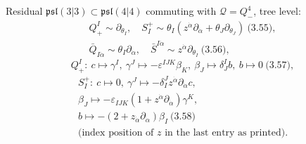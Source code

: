 \documentclass[10pt]{article}
\begin{document}
Residual $\mathfrak{psl}(3|3)\subset\mathfrak{psl}(4|4)$ commuting with $\mathcal Q=Q^4_-$, tree level:
\begin{gather*}
Q^I_+\sim\partial_{\theta_I},\quad S^+_I\sim\theta_I(z^{\dot\alpha}\partial_{\dot\alpha}+\theta_J\partial_{\theta_J})\ \text{(3.55)},\\
\bar Q_{I\dot\alpha}\sim\theta_I\partial_{\dot\alpha},\quad\bar S^{I\dot\alpha}\sim z^{\dot\alpha}\partial_{\theta_I}\ \text{(3.56)},
\end{gather*}
\begin{equation*}
Q^I_+:\ c\mapsto\gamma^I,\ \gamma^J\mapsto-\varepsilon^{IJK}\beta_K,\ \beta_J\mapsto\delta^I_Jb,\ b\mapsto0\ \text{(3.57)},
\end{equation*}
\begin{gather*}
S^+_I:\ c\mapsto0,\ \gamma^J\mapsto-\delta^J_Iz^{\dot\alpha}\partial_{\dot\alpha}c,\\ \beta_J\mapsto-\varepsilon_{IJK}(1+z^{\dot\alpha}\partial_{\dot\alpha})\gamma^K,\\ b\mapsto-(2+z_{\dot\alpha}\partial_{\dot\alpha})\beta_I\ \text{(3.58)}\\ \text{(index position of $z$ in the last entry as printed)}.
\end{gather*}
\end{document}
